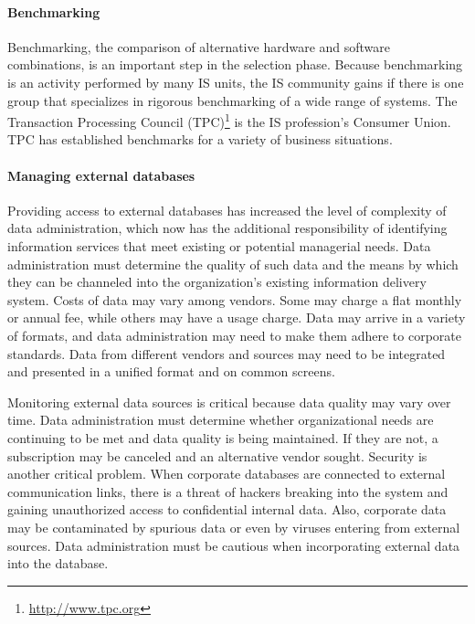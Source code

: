\documentclass[
]{article}
\begin{document}
\hypertarget{benchmarking-1}{%
\paragraph*{Benchmarking}\label{benchmarking-1}}

Benchmarking, the comparison of alternative hardware and software
combinations, is an important step in the selection phase. Because
benchmarking is an activity performed by many IS units, the IS community
gains if there is one group that specializes in rigorous benchmarking of
a wide range of systems. The Transaction Processing Council (TPC)\footnote{\url{http://www.tpc.org}} is
the IS profession's Consumer Union. TPC has established benchmarks for a
variety of business situations.

\hypertarget{managing-external-databases}{%
\paragraph*{Managing external databases}\label{managing-external-databases}}

Providing access to external databases has increased the level of
complexity of data administration, which now has the additional
responsibility of identifying information services that meet existing or
potential managerial needs. Data administration must determine the
quality of such data and the means by which they can be channeled into
the organization's existing information delivery system. Costs of data
may vary among vendors. Some may charge a flat monthly or annual fee,
while others may have a usage charge. Data may arrive in a variety of
formats, and data administration may need to make them adhere to
corporate standards. Data from different vendors and sources may need to
be integrated and presented in a unified format and on common screens.

Monitoring external data sources is critical because data quality may
vary over time. Data administration must determine whether
organizational needs are continuing to be met and data quality is being
maintained. If they are not, a subscription may be canceled and an
alternative vendor sought. Security is another critical problem. When
corporate databases are connected to external communication links, there
is a threat of hackers breaking into the system and gaining unauthorized
access to confidential internal data. Also, corporate data may be
contaminated by spurious data or even by viruses entering from external
sources. Data administration must be cautious when incorporating
external data into the database.
\end{document}
